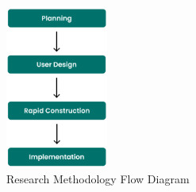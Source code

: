 \documentclass[conference,a4paper]{IEEEtran}
\begin{document}
\begin{figure}[htb]
  \centering
  \includegraphics[width=0.3\textwidth]{images/method}
  \caption{Research Methodology Flow Diagram}
  \label{method}
\end{figure}
\end{document}
